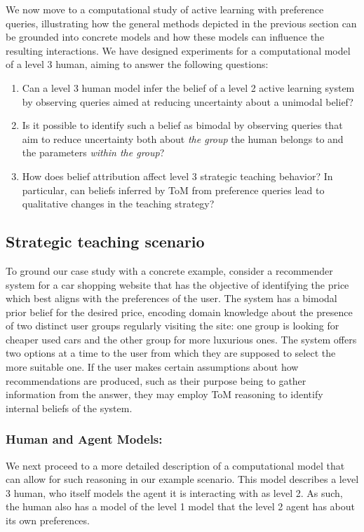 \documentclass[letterpaper]{article} %
\begin{document}
We now move to a computational study of active learning with preference queries, illustrating how the general methods depicted in the previous section can be grounded into concrete models and how these models can influence the  resulting interactions. We have designed experiments for a computational model of a level 3 human, aiming to answer the following questions:

\begin{enumerate}
    \item Can a level 3 human model infer the belief of a level 2 active learning system by observing queries aimed at reducing uncertainty about a unimodal belief?
    \item Is it possible to identify such a belief as bimodal by observing queries that aim to reduce uncertainty both about \textit{the group} the human belongs to and the parameters \textit{within the group}?
    \item How does belief attribution affect level 3 strategic teaching behavior? In particular, can beliefs inferred by ToM from preference queries lead to qualitative changes in the teaching strategy?
\end{enumerate}

\subsection{Strategic teaching scenario}

To ground our case study with a concrete example, consider a recommender system for a car shopping website that has the objective of identifying the price which best aligns with the preferences of the user. The system has a bimodal prior belief for the desired price, encoding domain knowledge about the presence of two distinct user groups regularly visiting the site: one group is looking for cheaper used cars and the other group for more luxurious ones. The system offers two options at a time to the user from which they are supposed to select the more suitable one. If the user makes certain assumptions about how recommendations are produced, such as their purpose being to gather information from the answer, they may employ ToM reasoning to identify internal beliefs of the system.

\subsubsection{Human and Agent Models:}

We next proceed to a more detailed description of a computational model that can allow for such reasoning in our example scenario. This model describes a level 3 human, who itself models the agent it is interacting with as level 2. As such, the human also has a model of the level 1 model that the level 2 agent has about its own preferences.
\end{document}
